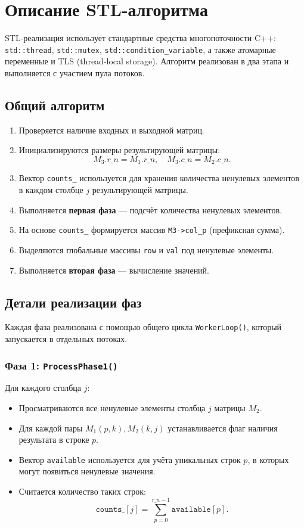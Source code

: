 \documentclass[12pt]{article}
\begin{document}
\section{Описание STL-алгоритма}

STL-реализация использует стандартные средства многопоточности C++: \texttt{std::thread}, \texttt{std::mutex}, \texttt{std::condition\_variable}, а также атомарные переменные и TLS (thread-local storage). Алгоритм реализован в два этапа и выполняется с участием пула потоков.

\subsection*{Общий алгоритм}

\begin{enumerate}
  \item Проверяется наличие входных и выходной матриц.
  \item Инициализируются размеры результирующей матрицы:
  \[
    M_3.r\_n = M_1.r\_n, \quad
    M_3.c\_n = M_2.c\_n.
  \]
  \item Вектор \texttt{counts\_} используется для хранения количества ненулевых элементов в каждом столбце \(j\) результирующей матрицы.
  \item Выполняется \textbf{первая фаза} — подсчёт количества ненулевых элементов.
  \item На основе \texttt{counts\_} формируется массив \texttt{M3->col\_p} (префиксная сумма).
  \item Выделяются глобальные массивы \texttt{row} и \texttt{val} под ненулевые элементы.
  \item Выполняется \textbf{вторая фаза} — вычисление значений.
\end{enumerate}

\subsection*{Детали реализации фаз}

Каждая фаза реализована с помощью общего цикла \texttt{WorkerLoop()}, который запускается в отдельных потоках.

\subsubsection*{Фаза 1: \texttt{ProcessPhase1()}}

Для каждого столбца \(j\):
\begin{itemize}
  \item Просматриваются все ненулевые элементы столбца \(j\) матрицы \(M_2\).
  \item Для каждой пары \(M_1(p,k), M_2(k,j)\) устанавливается флаг наличия результата в строке \(p\).
  \item Вектор \texttt{available} используется для учёта уникальных строк \(p\), в которых могут появиться ненулевые значения.
  \item Считается количество таких строк:
  \[
    \texttt{counts\_}[j] = \sum_{p=0}^{r\_n - 1} \texttt{available}[p].
  \]
\end{itemize}
\end{document}

